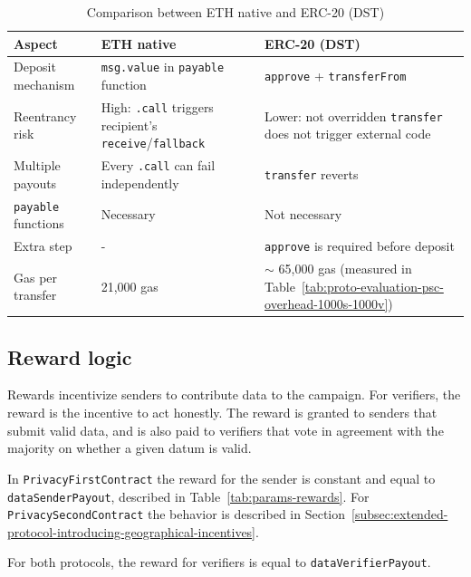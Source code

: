 \begin{table}
    \begin{tabular}{|p{2.8cm}|p{5.5cm}|p{5.5cm}|}
        \hline
        \textbf{Aspect} & \textbf{ETH native} & \textbf{ERC-20 (DST)} \\
        \hline
        Deposit mechanism
        & \texttt{msg.value} in \texttt{payable} function
        & \texttt{approve} + \texttt{transferFrom} \\
        \hline
        Reentrancy risk
        & High: \texttt{.call} triggers recipient's \texttt{receive}/\texttt{fallback}
        & Lower: not overridden \texttt{transfer} does not trigger external code \\
        \hline
        Multiple payouts
        & Every \texttt{.call} can fail independently
        & \texttt{transfer} reverts \\
        \hline
        \texttt{payable} functions
        & Necessary
        & Not necessary \\
        \hline
        Extra step
        & -
        & \texttt{approve} is required before deposit \\
        \hline
        Gas per transfer
        &  21,000 gas~\cite{wood2014ethereum}
        &  $\sim$ 65,000 gas (measured in Table~\ref{tab:proto-evaluation-psc-overhead-1000s-1000v}) \\
        \hline
    \end{tabular}
    \caption{Comparison between ETH native and ERC-20 (DST)}
    \label{tab:economic-model-eth-dst-comparison}
\end{table}

\subsection{Reward logic}\label{subsec:implementation-reward}
Rewards incentivize senders to contribute data to the campaign.
For verifiers, the reward is the incentive to act honestly.
The reward is granted to senders that submit valid data, and is also paid to verifiers that vote in agreement with the majority on whether a given datum is valid.

In \texttt{PrivacyFirstContract} the reward for the sender is constant and equal to \texttt{dataSenderPayout}, described in Table~\ref{tab:params-rewards}.
For \texttt{PrivacySecondContract} the behavior is described in Section~\ref{subsec:extended-protocol-introducing-geographical-incentives}.

For both protocols, the reward for verifiers is equal to \texttt{dataVerifierPayout}.

